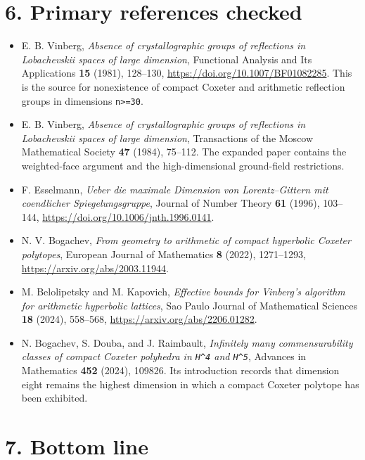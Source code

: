 \documentclass[
  10pt,
]{report}
\newcounter{none} %
\providecommand{\tightlist}{%
  \setlength{\itemsep}{0pt}\setlength{\parskip}{0pt}}
\begin{document}
\section{6. Primary references
checked}\label{primary-references-checked}

\begin{itemize}
\tightlist
\item
  E. B. Vinberg, \emph{Absence of crystallographic groups of reflections
  in Lobachevskii spaces of large dimension}, Functional Analysis and
  Its Applications \textbf{15} (1981), 128--130,
  \url{https://doi.org/10.1007/BF01082285}. This is the source for
  nonexistence of compact Coxeter and arithmetic reflection groups in
  dimensions \texttt{n\textgreater{}=30}.
\item
  E. B. Vinberg, \emph{Absence of crystallographic groups of reflections
  in Lobachevskii spaces of large dimension}, Transactions of the Moscow
  Mathematical Society \textbf{47} (1984), 75--112. The expanded paper
  contains the weighted-face argument and the high-dimensional
  ground-field restrictions.
\item
  F. Esselmann, \emph{Ueber die maximale Dimension von Lorentz--Gittern
  mit coendlicher Spiegelungsgruppe}, Journal of Number Theory
  \textbf{61} (1996), 103--144,
  \url{https://doi.org/10.1006/jnth.1996.0141}.
\item
  N. V. Bogachev, \emph{From geometry to arithmetic of compact
  hyperbolic Coxeter polytopes}, European Journal of Mathematics
  \textbf{8} (2022), 1271--1293, \url{https://arxiv.org/abs/2003.11944}.
\item
  M. Belolipetsky and M. Kapovich, \emph{Effective bounds for Vinberg's
  algorithm for arithmetic hyperbolic lattices}, Sao Paulo Journal of
  Mathematical Sciences \textbf{18} (2024), 558--568,
  \url{https://arxiv.org/abs/2206.01282}.
\item
  N. Bogachev, S. Douba, and J. Raimbault, \emph{Infinitely many
  commensurability classes of compact Coxeter polyhedra in
  \texttt{H\^{}4} and \texttt{H\^{}5}}, Advances in Mathematics
  \textbf{452} (2024), 109826. Its introduction records that dimension
  eight remains the highest dimension in which a compact Coxeter
  polytope has been exhibited.
\end{itemize}

\section{7. Bottom line}\label{bottom-line}
\end{document}
